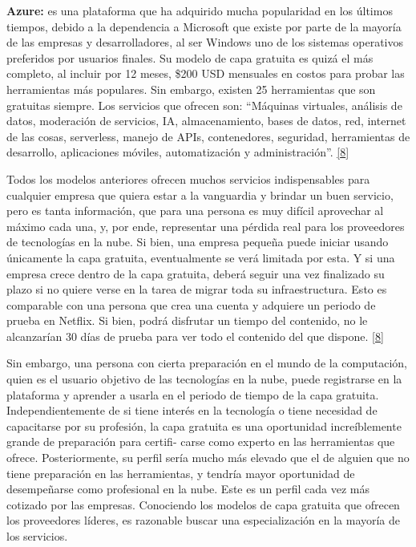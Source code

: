 \documentclass[12pt,spanish,Letterpaper,openany]{book}
\newcommand{\spaceminusmilis}{\vspace{-0.5mm}}
\begin{document}
\textbf{Azure:} es una plataforma que ha adquirido mucha popularidad en los últimos tiempos, debido a la dependencia a Microsoft que existe por parte de la mayoría de las empresas y desarrolladores, al ser Windows uno de los sistemas operativos preferidos por usuarios finales. Su modelo de capa gratuita es quizá el más completo, al incluir por 12 meses, \$200 USD mensuales en costos para probar las herramientas más populares. Sin embargo, existen 25 herramientas que son gratuitas siempre. Los servicios que ofrecen son: ``Máquinas virtuales, análisis de datos, moderación de servicios, IA, almacenamiento, bases de datos, red, internet de las cosas, serverless, manejo de APIs, contenedores, seguridad, herramientas de desarrollo, aplicaciones móviles, automatización y administración''. \protect\hyperlink{articulo10_ref08}{{[}8{]}}

\spaceminusmilis

Todos los modelos anteriores ofrecen muchos servicios indispensables para cualquier empresa que quiera estar a la vanguardia y brindar un buen servicio, pero es tanta información, que para una persona es muy difícil aprovechar al máximo cada una, y, por ende, representar una pérdida real para los proveedores de tecnologías en la nube. Si bien, una empresa pequeña puede iniciar usando únicamente la capa gratuita, eventualmente se verá limitada por esta. Y si una empresa crece dentro de la capa gratuita, deberá seguir una vez finalizado su plazo si no quiere verse en la tarea de migrar toda su infraestructura. Esto es comparable con una persona que crea una cuenta y adquiere un periodo de prueba en Netflix. Si bien, podrá disfrutar un tiempo del contenido, no le alcanzarían 30 días de prueba para ver todo el contenido del que dispone. \protect\hyperlink{articulo10_ref08}{{[}8{]}}

Sin embargo, una persona con cierta preparación en el mundo de la computación, quien es el usuario objetivo de las tecnologías en la nube, puede registrarse en la plataforma y aprender a usarla en el periodo de tiempo de la capa gratuita. Independientemente de si tiene interés en la tecnología o tiene necesidad de capacitarse por su profesión, la capa gratuita es una oportunidad increíblemente grande de preparación para certifi-
carse como experto en las herramientas que ofrece. Posteriormente, su perfil sería mucho más elevado que el de alguien que no tiene preparación en las herramientas, y tendría mayor oportunidad de desempeñarse como profesional en la nube. Este es un perfil cada vez más cotizado por las empresas. Conociendo los modelos de capa gratuita que ofrecen los proveedores líderes, es razonable buscar una especialización en la mayoría de los servicios.
\end{document}
